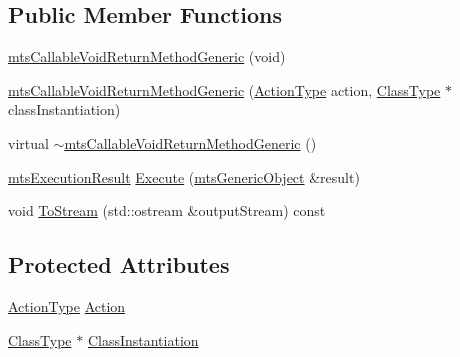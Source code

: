 \subsection*{Public Member Functions}
\begin{DoxyCompactItemize}
\item 
\hyperlink{classmts_callable_void_return_method_generic_a1f1a1a91485ab54baff1e281b4faab27}{mts\-Callable\-Void\-Return\-Method\-Generic} (void)
\item 
\hyperlink{classmts_callable_void_return_method_generic_a3bd1896e16edc15bc0fe7c9a61c7bab6}{mts\-Callable\-Void\-Return\-Method\-Generic} (\hyperlink{classmts_callable_void_return_method_generic_afa8b798ea4b9627d189beecfdc6200b6}{Action\-Type} action, \hyperlink{classmts_callable_void_return_method_generic_ac65a16eb6baf786e6eba07bb920cbf1f}{Class\-Type} $\ast$class\-Instantiation)
\item 
virtual \hyperlink{classmts_callable_void_return_method_generic_ab6e18a6783eb48a89decdfd7356ba62b}{$\sim$mts\-Callable\-Void\-Return\-Method\-Generic} ()
\item 
\hyperlink{classmts_execution_result}{mts\-Execution\-Result} \hyperlink{classmts_callable_void_return_method_generic_a91f3095091379fafba6adea4676d4019}{Execute} (\hyperlink{classmts_generic_object}{mts\-Generic\-Object} \&result)
\item 
void \hyperlink{classmts_callable_void_return_method_generic_aac08fdc349e9cea779f98809fa77ba44}{To\-Stream} (std\-::ostream \&output\-Stream) const 
\end{DoxyCompactItemize}
\subsection*{Protected Attributes}
\begin{DoxyCompactItemize}
\item 
\hyperlink{classmts_callable_void_return_method_generic_afa8b798ea4b9627d189beecfdc6200b6}{Action\-Type} \hyperlink{classmts_callable_void_return_method_generic_a3d55827aaf012a7732d1956ef5ff583e}{Action}
\item 
\hyperlink{classmts_callable_void_return_method_generic_ac65a16eb6baf786e6eba07bb920cbf1f}{Class\-Type} $\ast$ \hyperlink{classmts_callable_void_return_method_generic_a15414bc65b1c9d9b97b8cfcbc7c3b2d8}{Class\-Instantiation}
\end{DoxyCompactItemize}


